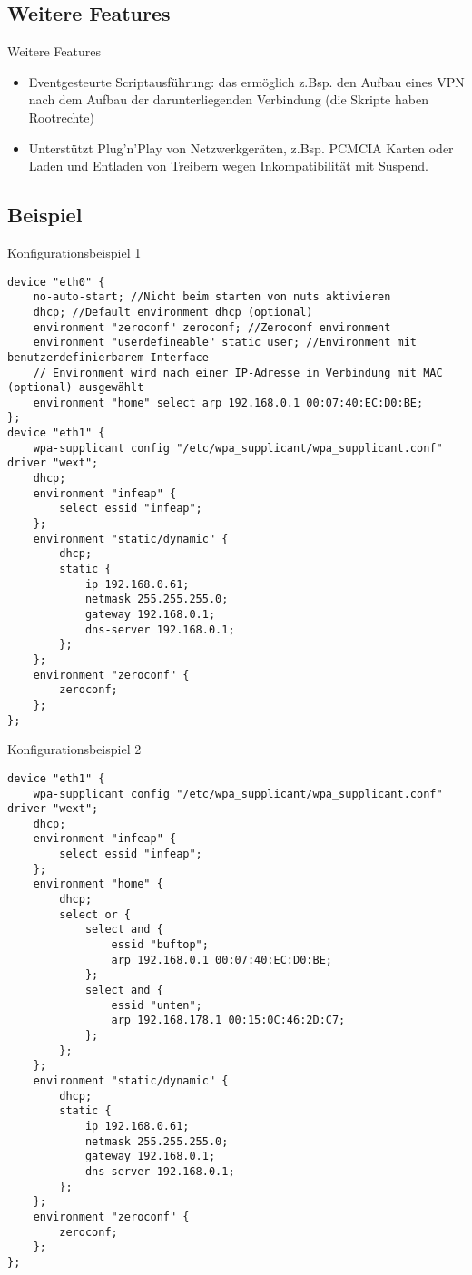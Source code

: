 \subsection{Weitere Features}
\begin{frame}[<+-|alert@+>]{Weitere Features}
	\begin{itemize}
		\item Eventgesteurte Scriptausführung: das ermöglich z.Bsp. den Aufbau eines VPN nach dem Aufbau der darunterliegenden Verbindung (die Skripte haben Rootrechte)
		\item Unterstützt Plug'n'Play von Netzwerkgeräten, z.Bsp. PCMCIA Karten oder Laden und Entladen von Treibern wegen Inkompatibilität mit Suspend.
	\end{itemize}
\end{frame}

\subsection{Beispiel}
\begin{frame}[fragile]{Konfigurationsbeispiel 1}
\tiny
\begin{verbatim}
device "eth0" {
    no-auto-start; //Nicht beim starten von nuts aktivieren
    dhcp; //Default environment dhcp (optional)
    environment "zeroconf" zeroconf; //Zeroconf environment
    environment "userdefineable" static user; //Environment mit benutzerdefinierbarem Interface
    // Environment wird nach einer IP-Adresse in Verbindung mit MAC (optional) ausgewählt
    environment "home" select arp 192.168.0.1 00:07:40:EC:D0:BE;
};
device "eth1" {
    wpa-supplicant config "/etc/wpa_supplicant/wpa_supplicant.conf" driver "wext";
    dhcp;
    environment "infeap" {
        select essid "infeap";
    };
    environment "static/dynamic" {
        dhcp;
        static {
            ip 192.168.0.61;
            netmask 255.255.255.0;
            gateway 192.168.0.1;
            dns-server 192.168.0.1;
        };
    };
    environment "zeroconf" {
        zeroconf;
    };
};
\end{verbatim}
\end{frame}

\begin{frame}[fragile]{Konfigurationsbeispiel 2}
\fontsize{4.8}{5.8} \selectfont
\begin{verbatim}
device "eth1" {
    wpa-supplicant config "/etc/wpa_supplicant/wpa_supplicant.conf" driver "wext";
    dhcp;
    environment "infeap" {
        select essid "infeap";
    };
    environment "home" {
        dhcp;
        select or {
            select and {
                essid "buftop";
                arp 192.168.0.1 00:07:40:EC:D0:BE;
            };
            select and {
                essid "unten";
                arp 192.168.178.1 00:15:0C:46:2D:C7;
            };
        };
    };
    environment "static/dynamic" {
        dhcp;
        static {
            ip 192.168.0.61;
            netmask 255.255.255.0;
            gateway 192.168.0.1;
            dns-server 192.168.0.1;
        };
    };
    environment "zeroconf" {
        zeroconf;
    };
};
\end{verbatim}
\end{frame}
